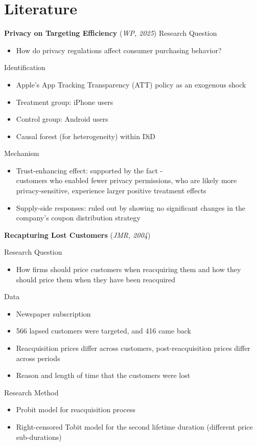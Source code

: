 \documentclass[aspectratio=169]{beamer}  %
\begin{document}
\section{Literature}
\begin{frame}{\textbf{Privacy on Targeting Efficiency} (\textit{WP, 2025})}
Research Question
\begin{itemize}
    \item How do privacy regulations affect consumer purchasing behavior?
\end{itemize}
Identification
\begin{itemize}
    \item Apple’s App Tracking Transparency (ATT) policy as an exogenous shock
    \item Treatment group: iPhone users
    \item Control group: Android users
    \item Causal forest (for heterogeneity) within DiD
\end{itemize}

Mechanism
\begin{itemize}
    \item Trust-enhancing effect: supported by the fact -\\ customers who enabled fewer privacy permissions, who are likely more privacy-sensitive, experience larger positive treatment effects
    \item Supply-side responses: ruled out by showing no significant changes in the company’s coupon distribution strategy 
\end{itemize}
\end{frame}



\begin{frame}{\textbf{Recapturing Lost Customers} (\textit{JMR, 2004})}

Research Question
\begin{itemize}
    \item How firms should price customers when reacquiring them and how they should price them when they have been reacquired
\end{itemize}

Data
\begin{itemize}
    \item Newspaper subscription
    \item 566 lapsed customers were targeted, and 416 came back
    \item Reacquisition prices differ across customers, post-reacquisition prices differ across periods
    \item Reason and length of time that the customers were lost
\end{itemize}
Research Method
\begin{itemize}
    \item Probit model for reacquisition process
    \item Right-censored Tobit model for the second lifetime duration (different price sub-durations)
    
\end{itemize}
\end{frame}
\end{document}
